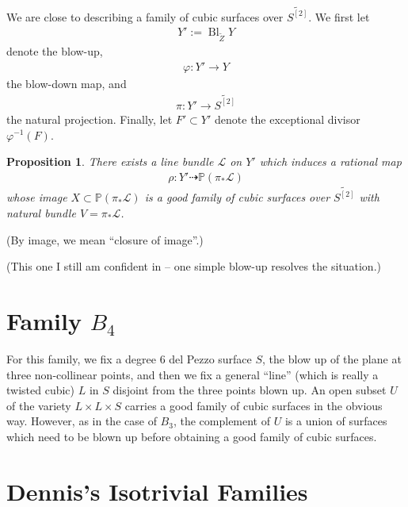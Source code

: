 \documentclass[12 pt]{amsart}
\newtheorem{proposition}{Proposition}[section]
\renewcommand{\P}{\mathbb{P}}
\newcommand{\<}{\left\langle}
\renewcommand{\>}{\right\rangle}
\DeclareMathOperator{\Bl}{Bl}
\begin{document}
We are close to describing a family of cubic surfaces over
$\widetilde{S^{[2]}}$.  We first let
\begin{align}
  \label{eq:XB3}
  Y' := \Bl_{\widetilde{Z}}Y
\end{align}
denote the blow-up,
\begin{align}
  \label{eq:phiB3}
  \varphi: Y' \to Y
\end{align}
the blow-down map, and
\begin{align}
  \label{eq:piB3}
  \pi: Y' \to \widetilde{S^{[2]}}
\end{align}
the natural projection. Finally, let $F' \subset Y'$ denote the
exceptional divisor $\varphi^{-1}(F)$.
\begin{proposition}
  \label{proposition:resolv-b3}
  There exists a line bundle $\mathcal{L}$ on $Y'$ which induces a
  rational map
  \begin{align*}
    \rho: Y' \dashrightarrow \P(\pi_{*}\mathcal{L})
  \end{align*}
  whose image $X \subset \P(\pi_{*}\mathcal{L})$ is a good family of
  cubic surfaces over $\widetilde{S^{[2]}}$ with natural bundle
  $V = \pi_{*} \mathcal{L}$.
\end{proposition}

(By image, we mean ``closure of image''.)

(This one I still am confident in -- one simple blow-up resolves the situation.)

\section{Family $B_4$}
\label{sec:family-b_4}

For this family, we fix a degree $6$ del Pezzo surface $S$, the blow
up of the plane at three non-collinear points, and then we fix a
general ``line'' (which is really a twisted cubic) $L$ in $S$ disjoint
from the three points blown up.  An open subset $U$ of the variety
$L \times L \times S$ carries a good family of cubic surfaces in the
obvious way. However, as in the case of $B_3$, the complement of $U$
is a union of surfaces which need to be blown up before obtaining a
good family of cubic surfaces.

\section{Dennis's Isotrivial Families}
\label{sec:denn-isotr-famil}




%
%
\end{document}
